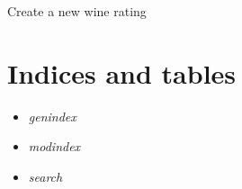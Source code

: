 \documentclass[letterpaper,10pt,english]{sphinxmanual}
\begin{document}
Create a new wine rating


\begin{fulllineitems}
\label{personality:post--api-v1-rating-}
\end{fulllineitems}



\chapter{Indices and tables}
\label{index:indices-and-tables}\begin{itemize}
\item {} 
\emph{genindex}

\item {} 
\emph{modindex}

\item {} 
\emph{search}

\end{itemize}
\end{document}
